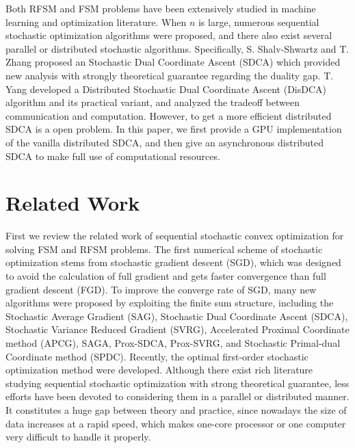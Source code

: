 \documentclass{article}
\begin{document}
Both RFSM and FSM problems have been extensively studied in machine learning and
optimization literature. When $n$ is large, numerous sequential stochastic
optimization algorithms were
proposed\cite{bottou2010large,nemirovski2009robust,roux2012stochastic,shalev2013stochastic,shalev2013accelerated,johnson2013accelerating,ouyang2013stochastic,
suzuki2013dual,shalev2014accelerated,xiao2014proximal,defazio2014saga,zhang2015stochastic,lin2014accelerated,defazio2016simple,allen2016katyusha,lan2015optimal},
and there also exist several parallel or distributed stochastic
algorithms\cite{boyd2011distributed,recht2011hogwild,zinkevich2010parallelized,yang2013trading,zhang2014asynchronous,zinkevich2010parallelized,agarwal2011distributed}.
Specifically, S. Shalv-Shwartz and T. Zhang \cite{shalev2013stochastic} proposed
an Stochastic Dual Coordinate Ascent (SDCA) which provided new analysis with strongly theoretical
guarantee regarding the duality gap. T. Yang \cite{yang2013trading,yang2013analysis} developed a
Distributed Stochastic Dual Coordinate Ascent (DisDCA) algorithm and its
practical variant, and analyzed the tradeoff between communication and
computation. However, to get a more efficient distributed SDCA is a open
problem. In this paper, we first provide a GPU implementation of the vanilla
distributed SDCA\cite{yang2013trading}, and then give an asynchronous
distributed SDCA to make full use of computational resources. 

\section{Related Work}
\label{gen_inst}
First we review the related work of sequential stochastic convex optimization
for solving FSM and RFSM problems. The first numerical scheme of stochastic
optimization stems from stochastic gradient descent
(SGD)\cite{bottou2010large,nemirovski2009robust}, which was designed to avoid
the calculation of full gradient and gets faster convergence than full gradient
descent (FGD). To improve the converge rate of SGD, many new algorithms were
proposed by exploiting the finite sum structure, including the Stochastic
Average Gradient (SAG)\cite{roux2012stochastic}, Stochastic Dual Coordinate
Ascent (SDCA)\cite{shalev2013stochastic}, Stochastic Variance Reduced Gradient
(SVRG)\cite{johnson2013accelerating}, Accelerated Proximal Coordinate method
(APCG)\cite{lin2014accelerated},  SAGA\cite{Defazio2014},
Prox-SDCA\cite{shalev2014accelerated}, Prox-SVRG\cite{xiao2014proximal}, and
Stochastic Primal-dual Coordinate method (SPDC)\cite{zhang2015stochastic}.
Recently, the optimal first-order stochastic optimization method were
developed\cite{allen2016katyusha,lan2015optimal}. Although there exist rich
literature studying sequential stochastic optimization with strong theoretical
guarantee, less efforts have been devoted to considering them in a parallel or
distributed manner. It constitutes a huge gap between theory and practice, since
nowadays the size of data increases at a rapid speed, which makes one-core
processor or one computer very difficult to handle it properly. 
\end{document}
